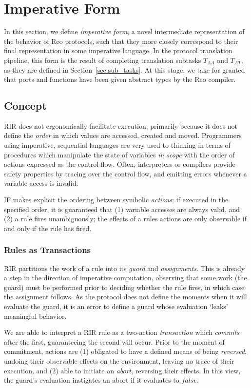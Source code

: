 \section{Imperative Form}
\label{sec:imperative_form_sec}
In this section, we define \textit{imperative form}, a novel intermediate representation of the behavior of Reo protocols, such that they more closely correspond to their final representation in some imperative language. In the protocol translation pipeline, this form is the result of completing translation subtasks $T_{AA}$ and $T_{AT}$, as they are defined in Section~\ref{sec:sub_tasks}. At this stage, we take for granted that ports and functions have been given abstract types by the Reo compiler.

\subsection{Concept}
RIR does not ergonomically facilitate execution, primarily because it does not define the \textit{order} in which values are accessed, created and moved. Programmers using imperative, sequential languages are very used to thinking in terms of procedures which manipulate the state of variables \textit{in scope} with the order of actions expressed as the control flow. Often, interpreters or compilers provide safety properties by tracing over the control flow, and emitting errors whenever a variable access is invalid.

IF makes explicit the ordering between symbolic \textit{actions}; if executed in the specified order, it is guaranteed that (1) variable accesses are always valid, and (2) a rule fires unambiguously; the effects of a rules actions are only observable if and only if the rule has fired.

\subsubsection{Rules as Transactions}

RIR partitions the work of a rule into its \textit{guard} and \textit{assignments}. This is already a step in the direction of imperative computation, observing that some work (the guard) must be performed prior to deciding whether the rule fires, in which case the assignment follows. As the protocol does not define the moments when it will evaluate the guard, it is an error to define a guard whose evaluation `leaks' meaningful behavior. 

We are able to interpret a RIR rule as a two-action \textit{transaction} which \textit{commits} after the first, guaranteeing the second will occur. Prior to the moment of commitment, actions are (1) obligated to have a defined means of being \textit{reversed}, undoing their observable effects on the environment, leaving no trace of their execution, and (2) able to initiate an \textit{abort}, reversing their effects. In this view, the guard's evaluation instigates an abort if it evaluates to $false$.

